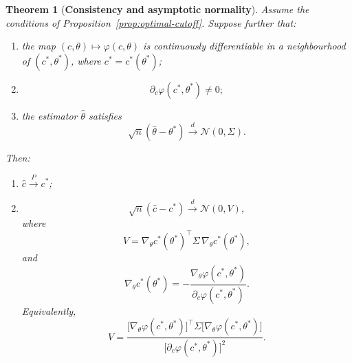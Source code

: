\documentclass[11pt,a4paper]{article}
\newtheorem{theorem}{Theorem}[section]
\theoremstyle{definition}
\theoremstyle{remark}
\newcommand{\1}{\mathbf{1}}
\begin{document}
\begin{theorem}[\textbf{Consistency and asymptotic normality}]
\label{thm:asymptotics}
Assume the conditions of Proposition~\ref{prop:optimal-cutoff}. Suppose further that:
\begin{enumerate}
\item the map $(c,\theta)\mapsto\varphi(c,\theta)$ is continuously differentiable in a neighbourhood of $(c^*,\theta^*)$, where $c^*=c^*(\theta^*)$;
\item
\[
\partial_c\varphi(c^*,\theta^*)\neq 0;
\]
\item the estimator $\hat\theta$ satisfies
\[
\sqrt{n}(\hat\theta-\theta^*)\stackrel{d}{\longrightarrow}\mathcal N(0,\Sigma).
\]
\end{enumerate}
Then:
\begin{enumerate}
\item $\hat c\xrightarrow{P}c^*$;
\item
\[
\sqrt{n}(\hat c-c^*)\stackrel{d}{\longrightarrow}\mathcal N(0,V),
\]
where
\begin{equation}
\label{eq:V-general}
V
=
\nabla_\theta c^*(\theta^*)^\top\Sigma\,\nabla_\theta c^*(\theta^*),
\end{equation}
and
\begin{equation}
\label{eq:gradient-cstar}
\nabla_\theta c^*(\theta^*)
= - \frac{\nabla_\theta\varphi(c^*,\theta^*)}{\partial_c\varphi(c^*,\theta^*)}.
\end{equation}
Equivalently,
\begin{equation}
\label{eq:variance}
V
=
\frac{
\bigl[\nabla_\theta\varphi(c^*,\theta^*)\bigr]^\top
\Sigma
\bigl[\nabla_\theta\varphi(c^*,\theta^*)\bigr]
}{
\bigl[\partial_c\varphi(c^*,\theta^*)\bigr]^2
}.
\end{equation}
\end{enumerate}
\end{theorem}
\end{document}
